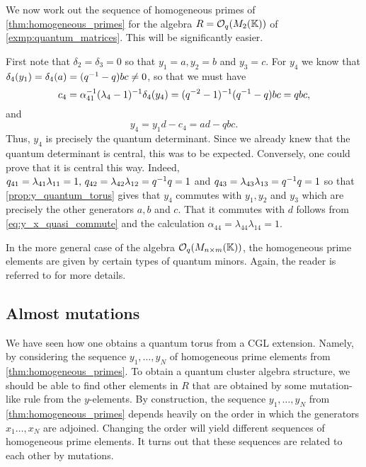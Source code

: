 \begin{example}\label{exmp:quantum_matrices_hom_primes}
	We now work out the sequence of homogeneous primes of \cref{thm:homogeneous_primes} for the algebra $R = \mathcal{O}_q(M_2(\mathbb{K}))$ of \cref{exmp:quantum_matrices}. This will be significantly easier.

	First note that $\delta_2 = \delta_3 = 0$ so that $y_1 = a, y_2 = b$ and $y_3 = c$. For
	$y_4$ we know that $\delta_4(y_1) = \delta_4(a) = (q^{-1} -q)bc \neq 0$, so that we must
	have
	\begin{equation*}
		c_4 = \alpha_{41}^{-1}(\lambda_4 -1)^{-1} \delta_4(y_4) = (q^{-2} - 1)^{-1}(q^{-1} - q)bc = q bc,
	\end{equation*}
	and
	\begin{equation*}
		y_4 = y_1 d - c_4 = a d - q bc.
	\end{equation*}
	Thus, $y_4$ is precisely the quantum determinant. Since we already knew that the
	quantum determinant is central, this was to be expected. Conversely, one could prove
	that it is central this way. Indeed, $q_{41} = \lambda_{41}\lambda_{11} = 1, \, q_{42}
		= \lambda_{42}\lambda_{12} = q^{-1} q = 1$ and $q_{43} = \lambda_{43}\lambda_{13} =
		q^{-1} q = 1$ so that \cref{prop:y_quantum_torus} gives that $y_4$ commutes with
	$y_1,y_2$ and $y_3$ which are precisely the other generators $a,b$ and $c$. That it
	commutes with $d$ follows from \cref{eq:y_x_quasi_commute} and the calculation
	$\alpha_{44} = \lambda_{44}\lambda_{14} = 1$.

	In the more general case of the algebra $\mathcal{O}_q(M_{n \times m}(\mathbb{K}))$, the homogeneous
	prime elements are given by certain types of quantum minors. Again, the reader is
	referred to \cite{GoodearlYakimov2017QCA} for more details.
\end{example}

\subsection{Almost mutations}

We have seen how one obtains a quantum torus from a CGL extension. Namely, by
considering the sequence $y_1, \dots, y_N$ of homogeneous prime elements from
\cref{thm:homogeneous_primes}. To obtain a quantum cluster algebra structure, we should
be able to find other elements in $R$ that are obtained by some mutation-like rule from
the $y$-elements. By construction, the sequence $y_1, \dots, y_N$ from
\cref{thm:homogeneous_primes} depends heavily on the order in which the generators $x_1
	\dots, x_N$ are adjoined. Changing the order will yield different sequences of
homogeneous prime elements. It turns out that these sequences are related to each other
by mutations.

